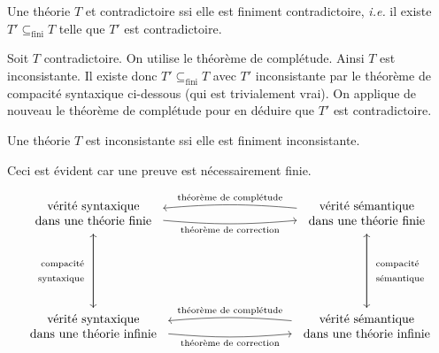 \documentclass[./main]{subfiles}
\begin{document}
  \begin{thm}
    Une théorie $T$ et contradictoire ssi elle est finiment contradictoire, \textit{i.e.} il existe $T' \subseteq_\mathrm{fini} T$ telle que $T'$ est contradictoire.
  \end{thm}
  \begin{prv}
    Soit $T$ contradictoire.
    On utilise le théorème de complétude.
    Ainsi $T$ est inconsistante.
    Il existe donc $T' \subseteq_\mathrm{fini} T$ avec $T'$ inconsistante par le théorème de compacité syntaxique ci-dessous (qui est trivialement vrai).
    On applique de nouveau le théorème de complétude pour en déduire que $T'$ est contradictoire.
  \end{prv}

  \begin{thm}
    Une théorie $T$ est inconsistante ssi elle est finiment inconsistante.
  \end{thm}
  \begin{prv}
    Ceci est évident car une preuve est nécessairement finie.
  \end{prv}

  \vspace{-2\baselineskip}

  \[
  \begin{tikzcd}[column sep=100, row sep=60]
    \begin{array}{c}
      \text{vérité syntaxique}\\
      \text{dans une théorie finie}
    \end{array}
    \arrow[swap]{d}{\begin{array}{r}\text{compacité}\\\text{syntaxique}\end{array}}
    \arrow[bend right=5,swap]{r}{\text{théorème de correction}}&
    \arrow[bend right=5,swap]{l}{\text{théorème de complétude}}
    \begin{array}{c}
      \text{vérité sémantique}\\
      \text{dans une théorie finie}
    \end{array}
    \arrow{d}{\begin{array}{l}\text{compacité}\\\text{sémantique}\end{array}}\\
    \arrow{u}{}
    \begin{array}{c}
      \text{vérité syntaxique}\\
      \text{dans une théorie infinie}
    \end{array}
    \arrow[bend right=5,swap]{r}{\text{théorème de correction}}&
    \arrow[bend right=5,swap]{l}{\text{théorème de complétude}}
    \begin{array}{c}
      \text{vérité sémantique}\\
      \text{dans une théorie infinie}
    \end{array}
    \arrow{u}{}
  \end{tikzcd}
  \]
\end{document}
